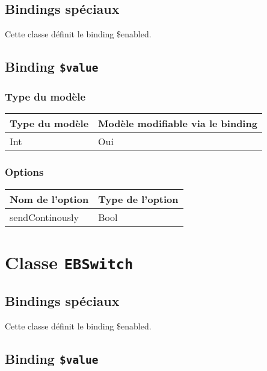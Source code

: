\subsection{Bindings spéciaux}

Cette classe définit le binding \$enabled.

\subsection{Binding \texttt{\$value}}

\subsubsection{Type du modèle}

\begin{tabular}{|l|l|}
\hline
\textbf{Type du modèle} & \textbf{Modèle modifiable via le binding}\\
\hline
Int & Oui\\
\hline
\end{tabular}
\subsubsection{Options}

\begin{tabular}{|l|l|}
\hline
\textbf{Nom de l'option} & \textbf{Type de l'option}\\
\hline
sendContinously & Bool\\
\hline
\end{tabular}







\section{Classe \texttt{EBSwitch}}

\subsection{Bindings spéciaux}

Cette classe définit le binding \$enabled.

\subsection{Binding \texttt{\$value}}

